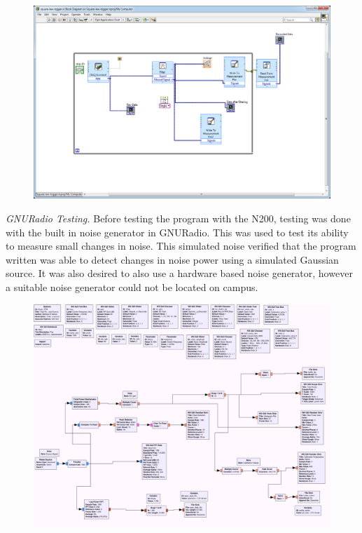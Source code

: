 {\begin{figure}[h!tb] \centering
\includegraphics[width=\textwidth]{Images/labview-diagram.png}
\label{labviewblock}
\end{figure}
}

\emph{GNURadio Testing.  }Before testing the program with the N200, testing was done with the built in noise generator in GNURadio.  This was used to test its ability to measure small changes in noise.  This simulated noise verified that the program written was able to detect changes in noise power using a simulated Gaussian source.  It was also desired to also use a hardware based noise generator, however a suitable noise generator could not be located on campus.

{\begin{figure}[h!tb] \centering
\includegraphics[width=\textwidth]{Images/noisesrc_radiometer.png}
\label{noise_test}
\end{figure}
}

